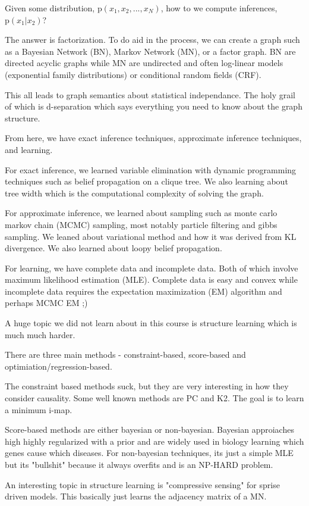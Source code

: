 \documentclass[11pt]{article}
\newcommand{\prob}[1]{\text{p}(#1)} %
\begin{document}
 	Given some distribution, $\prob{x_1, x_2, ..., x_N}$, how to we compute inferences, $\prob{x_1|x_2}$?

 	The answer is factorization. To do aid in the process, we can create a graph such as a Bayesian Network (BN), Markov Network (MN), or a factor graph. BN are directed acyclic graphs while MN are undirected and often log-linear models (exponential family distributions) or conditional random fields (CRF).

 	This all leads to graph semantics about statistical independance. The holy grail of which is d-separation which says everything you need to know about the graph structure.

 	From here, we have exact inference techniques, approximate inference techniques, and learning. 

 	For exact inference, we learned variable elimination with dynamic programming techniques such as belief propagation on a clique tree. We also learning about tree width which is the computational complexity of solving the graph.

 	For approximate inference, we learned about sampling such as monte carlo markov chain (MCMC) sampling, most notably particle filtering and gibbs sampling. We leaned about variational method and how it was derived from KL divergence. We also learned about loopy belief propagation. 

 	For learning, we have complete data and incomplete data. Both of which involve maximum likelihood estimation (MLE). Complete data is easy and convex while incomplete data requires the expectation maximization (EM) algorithm and perhaps MCMC EM ;)

 	A huge topic we did not learn about in this course is structure learning which is much much harder.

 	There are three main methods - constraint-based, score-based and optimiation/regression-based.

 	The constraint based methods suck, but they are very interesting in how they consider causality. Some well known methods are PC and K2. The goal is to learn a minimum i-map. 

 	Score-based methods are either bayesian or non-bayesian. Bayesian approiaches high highly regularized with a prior and are widely used in biology learning which genes cause which diseases. For non-bayesian techniques, its just a simple MLE but its "bullshit" because it always overfits and is an NP-HARD problem. 


 	An interesting topic in structure learning is "compressive sensing" for sprise driven models. This basically just learns the adjacency matrix of a MN.



	
\end{document}
